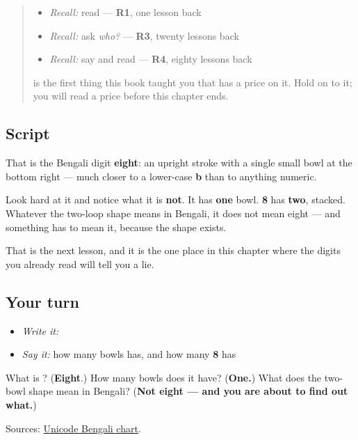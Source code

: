 \begin{quote}
\begin{itemize}
\raggedright
  \item \emph{Recall:} read \textbf{} — \textbf{R1}, one lesson back
  \item \emph{Recall:} ask \emph{who?} — \textbf{R3}, twenty lessons back
  \item \emph{Recall:} say and read \textbf{} — \textbf{R4}, eighty lessons back
\end{itemize}

\textbf{} is the first thing this book taught you that has a price on it. Hold on to it; you will read a price before this chapter ends.
\end{quote}

\subsection*{Script}
\begin{quote}
\end{quote}

That is the Bengali digit \textbf{eight}: an upright stroke with a single small bowl at the bottom right — much closer to a lower-case \textbf{b} than to anything numeric.

Look hard at it and notice what it is \textbf{not}. It has \textbf{one} bowl. \textbf{8} has \textbf{two}, stacked. Whatever the two-loop shape means in Bengali, it does not mean eight — and something has to mean it, because the shape exists.

That is the next lesson, and it is the one place in this chapter where the digits you already read will tell you a lie.

\subsection*{Your turn}
\begin{itemize}
\raggedright
  \item \emph{Write it:} 
  \item \emph{Say it:} how many bowls \textbf{} has, and how many \textbf{8} has
\end{itemize}

\begin{tcolorbox}[breakable,colback=teal!4,colframe=teal!35!black,title={Before you move on}]
What is \textbf{}? (\textbf{Eight}.) How many bowls does it have? (\textbf{One.}) What does the two-bowl shape mean in Bengali? (\textbf{Not eight — and you are about to find out what.})

Sources: \href{https://www.unicode.org/charts/PDF/U0980.pdf}{Unicode Bengali chart}.
\end{tcolorbox}
